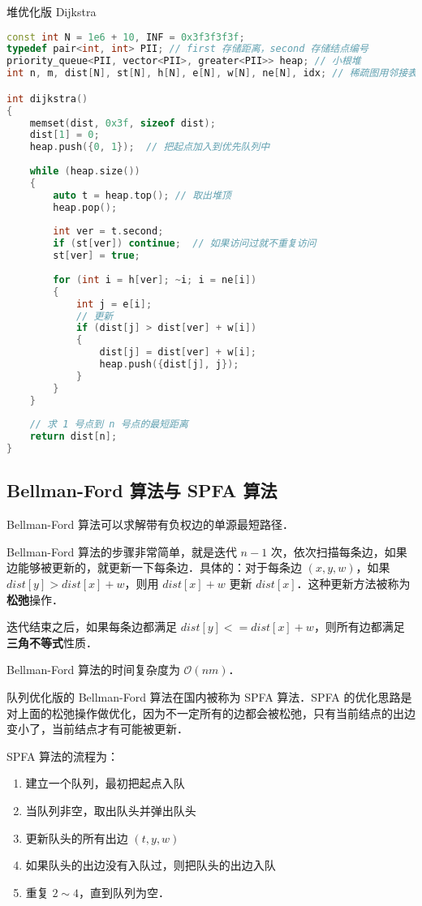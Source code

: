 堆优化版 Dijkstra

\begin{lstlisting}[language=cpp]
const int N = 1e6 + 10, INF = 0x3f3f3f3f;
typedef pair<int, int> PII; // first 存储距离，second 存储结点编号
priority_queue<PII, vector<PII>, greater<PII>> heap; // 小根堆
int n, m, dist[N], st[N], h[N], e[N], w[N], ne[N], idx; // 稀疏图用邻接表存图

int dijkstra()
{
    memset(dist, 0x3f, sizeof dist);
    dist[1] = 0;
    heap.push({0, 1});  // 把起点加入到优先队列中
    
    while (heap.size())
    {
        auto t = heap.top(); // 取出堆顶
        heap.pop();
        
        int ver = t.second;
        if (st[ver]) continue;  // 如果访问过就不重复访问
        st[ver] = true;
        
        for (int i = h[ver]; ~i; i = ne[i])
        {
            int j = e[i];
            // 更新
            if (dist[j] > dist[ver] + w[i])
            {
                dist[j] = dist[ver] + w[i];
                heap.push({dist[j], j});
            }
        }
    }
    
    // 求 1 号点到 n 号点的最短距离
    return dist[n];
}
\end{lstlisting}

\subsection{Bellman-Ford 算法与 SPFA 算法}

Bellman-Ford 算法可以求解带有负权边的单源最短路径．

Bellman-Ford 算法的步骤非常简单，就是迭代 $n - 1$ 次，依次扫描每条边，如果边能够被更新的，就更新一下每条边．具体的：对于每条边 $(x, y, w)$，如果 $dist[y] > dist[x] + w$，则用 $dist[x] + w$ 更新 $dist[x]$．这种更新方法被称为\textbf{松弛}操作．

迭代结束之后，如果每条边都满足 $dist[y] <= dist[x] + w$，则所有边都满足\textbf{三角不等式}性质．

Bellman-Ford 算法的时间复杂度为 $\mathcal{O}(nm)$．

队列优化版的 Bellman-Ford 算法在国内被称为 SPFA 算法．SPFA 的优化思路是对上面的松弛操作做优化，因为不一定所有的边都会被松弛，只有当前结点的出边变小了，当前结点才有可能被更新．

SPFA 算法的流程为：

\begin{enumerate}
\item 建立一个队列，最初把起点入队
\item 当队列非空，取出队头并弹出队头
\item 更新队头的所有出边 $(t, y, w)$
\item 如果队头的出边没有入队过，则把队头的出边入队
\item 重复 $2 \sim 4$，直到队列为空．
\end{enumerate}

